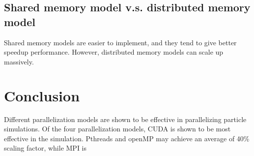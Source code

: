 \documentclass[11pt]{article}
\begin{document}
\subsection{Shared memory model v.s. distributed memory model}
Shared memory models are easier to implement, and they tend to give better speedup performance. However, distributed memory 
models can scale up massively.

\section{Conclusion}
Different parallelization models are shown to be effective in parallelizing particle simulations. Of the four parallelization models,
CUDA is shown to be most effective in the simulation. Pthreads and openMP may achieve an average of 40\% scaling factor, while
MPI is 



\end{document}
